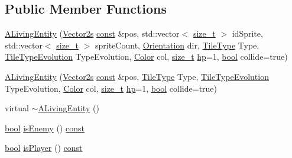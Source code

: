 \subsection*{Public Member Functions}
\begin{DoxyCompactItemize}
\item 
\hyperlink{classarcade_1_1_a_living_entity_a98a8ef0ec817b737fd63924bed1b7425}{A\-Living\-Entity} (\hyperlink{namespacearcade_a8e527f7400fbff9c38dc31e0a3dd06a1}{Vector2s} \hyperlink{term__entry_8h_a57bd63ce7f9a353488880e3de6692d5a}{const} \&pos, std\-::vector$<$ \hyperlink{nc__alloc_8h_a7b60c5629e55e8ec87a4547dd4abced4}{size\-\_\-t} $>$ id\-Sprite, std\-::vector$<$ \hyperlink{nc__alloc_8h_a7b60c5629e55e8ec87a4547dd4abced4}{size\-\_\-t} $>$ sprite\-Count, \hyperlink{namespacearcade_a370755573a2c68e25c59bedd4bce1342}{Orientation} dir, \hyperlink{namespacearcade_a61ba576694ea309cdf2b4b66902408ca}{Tile\-Type} Type, \hyperlink{namespacearcade_a2e0a64a64203f78c9efb84a1475a8cf4}{Tile\-Type\-Evolution} Type\-Evolution, \hyperlink{unionarcade_1_1_color}{Color} col, \hyperlink{nc__alloc_8h_a7b60c5629e55e8ec87a4547dd4abced4}{size\-\_\-t} \hyperlink{classarcade_1_1_a_living_entity_a47a3ed7e55199abbf84e2b80eb9df233}{hp}=1, \hyperlink{term__entry_8h_a002004ba5d663f149f6c38064926abac}{bool} collide=true)
\item 
\hyperlink{classarcade_1_1_a_living_entity_a6d930377c429a618b82a61ce777451ce}{A\-Living\-Entity} (\hyperlink{namespacearcade_a8e527f7400fbff9c38dc31e0a3dd06a1}{Vector2s} \hyperlink{term__entry_8h_a57bd63ce7f9a353488880e3de6692d5a}{const} \&pos, \hyperlink{namespacearcade_a61ba576694ea309cdf2b4b66902408ca}{Tile\-Type} Type, \hyperlink{namespacearcade_a2e0a64a64203f78c9efb84a1475a8cf4}{Tile\-Type\-Evolution} Type\-Evolution, \hyperlink{unionarcade_1_1_color}{Color} col, \hyperlink{nc__alloc_8h_a7b60c5629e55e8ec87a4547dd4abced4}{size\-\_\-t} \hyperlink{classarcade_1_1_a_living_entity_a47a3ed7e55199abbf84e2b80eb9df233}{hp}=1, \hyperlink{term__entry_8h_a002004ba5d663f149f6c38064926abac}{bool} collide=true)
\item 
virtual \hyperlink{classarcade_1_1_a_living_entity_a61b9269f2c1420ee55ca864d281ef3f6}{$\sim$\-A\-Living\-Entity} ()
\item 
\hyperlink{term__entry_8h_a002004ba5d663f149f6c38064926abac}{bool} \hyperlink{classarcade_1_1_a_living_entity_acd313e68d1ca60a72d3df76c1a18ad40}{is\-Enemy} () \hyperlink{term__entry_8h_a57bd63ce7f9a353488880e3de6692d5a}{const} 
\item 
\hyperlink{term__entry_8h_a002004ba5d663f149f6c38064926abac}{bool} \hyperlink{classarcade_1_1_a_living_entity_a4121f6abd69ac69bdf199f92d37d2a63}{is\-Player} () \hyperlink{term__entry_8h_a57bd63ce7f9a353488880e3de6692d5a}{const} 

\end{DoxyCompactItemize}
